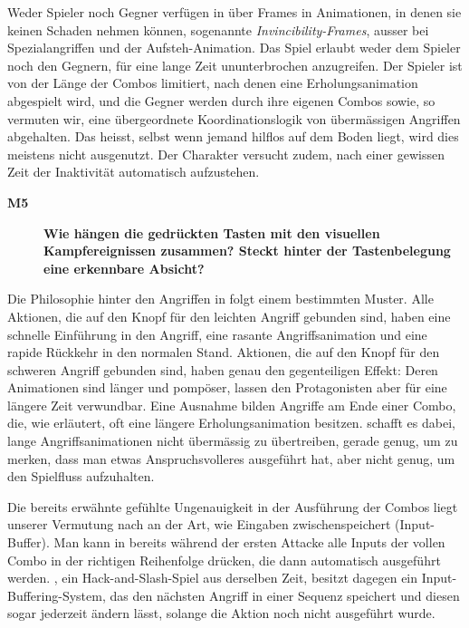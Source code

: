 \documentclass[../Main.tex]{subfiles}
\begin{document}
Weder Spieler noch Gegner verfügen in  über Frames in Animationen, in denen sie keinen Schaden nehmen können, sogenannte \textit{Invincibility-Frames}, ausser bei Spezialangriffen und der Aufsteh-Animation. Das Spiel erlaubt weder dem Spieler noch den Gegnern, für eine lange Zeit ununterbrochen anzugreifen. Der Spieler ist von der Länge der Combos limitiert, nach denen eine Erholungsanimation abgespielt wird, und die Gegner werden durch ihre eigenen Combos sowie, so vermuten wir, eine übergeordnete Koordinationslogik von übermässigen Angriffen abgehalten. Das heisst, selbst wenn jemand hilflos auf dem Boden liegt, wird dies meistens nicht ausgenutzt. Der Charakter versucht zudem, nach einer gewissen Zeit der Inaktivität automatisch aufzustehen.

\begin{description}
    \item[\textbf{M5}] \textbf{Wie hängen die gedrückten Tasten mit den visuellen Kampfereignissen zusammen? Steckt hinter der Tastenbelegung eine erkennbare Absicht?}
\end{description}

Die Philosophie hinter den Angriffen in  folgt einem bestimmten Muster. Alle Aktionen, die auf den Knopf für den leichten Angriff gebunden sind, haben eine schnelle Einführung in den Angriff, eine rasante Angriffsanimation und eine rapide Rückkehr in den normalen Stand. Aktionen, die auf den Knopf für den schweren Angriff gebunden sind, haben genau den gegenteiligen Effekt: Deren Animationen sind länger und pompöser, lassen den Protagonisten aber für eine längere Zeit verwundbar. Eine Ausnahme bilden Angriffe am Ende einer Combo, die, wie erläutert, oft eine längere Erholungsanimation besitzen.  schafft es dabei, lange Angriffsanimationen nicht übermässig zu übertreiben, gerade genug, um zu merken, dass man etwas Anspruchsvolleres ausgeführt hat, aber nicht genug, um den Spielfluss aufzuhalten.

Die bereits erwähnte gefühlte Ungenauigkeit in der Ausführung der Combos liegt unserer Vermutung nach an der Art, wie  Eingaben zwischenspeichert (Input-Buffer). Man kann in  bereits während der ersten Attacke alle Inputs der vollen Combo in der richtigen Reihenfolge drücken, die dann automatisch ausgeführt werden. ,\autocite{capcom_devilmaycry3_2005} ein Hack-and-Slash-Spiel aus derselben Zeit, besitzt dagegen ein Input-Buffering-System, das den nächsten Angriff in einer Sequenz speichert und diesen sogar jederzeit ändern lässt, solange die Aktion noch nicht ausgeführt wurde.\autocite{dmcwiki_inputbuffering}
\end{document}
